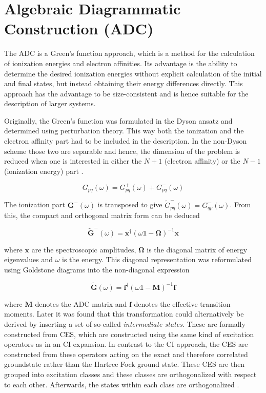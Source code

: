 \chapter{Algebraic Diagrammatic Construction (ADC)}

The \acl{ADC} is a Green's function approach, which is a method for the
calculation of ionization
energies and electron affinities.
Its advantage is the ability to determine the desired ionization energies
without explicit calculation of the initial and final states, but instead
obtaining their energy differences directly.
This approach has the advantage to be size-consistent and is hence
suitable for the description of larger systems. \cite{Mertins96_1}

Originally, the Green's function was formulated in the Dyson ansatz and
determined using perturbation theory. This way both the ionization and the
electron affinity part had to be included in the description. In the non-Dyson
scheme those two are separable and hence, the dimension of the problem is reduced
when one is interested in either the $N+1$ (electron affinity)
or the $N-1$ (ionization energy) part \cite{Schirmer98}.

\begin{equation}
 G_{pq}(\omega) = G^+_{pq}(\omega) + G^-_{pq}(\omega)
\end{equation}

The ionization part $\mathbf{G^-}(\omega)$ is transposed to give
$\tilde{G}^-_{pq}(\omega) = G^-_{qp}(\omega)$. From this, the compact 
and orthogonal matrix
form can be deduced

\begin{equation}\label{matrixspec}
\mathbf{\tilde{G}}^-(\omega) = \mathbf{x}^\dagger
                               (\omega\mathds{1}-\mathbf{\Omega})^{-1}\mathbf{x}
\end{equation}

where $\mathbf{x}$ are the spectroscopic amplitudes, $\mathbf{\Omega}$ is
the diagonal matrix of energy eigenvalues and $\omega$ is the energy.
This diagonal representation was reformulated using Goldstone diagrams
into the non-diagonal expression

\begin{equation}\label{isradc}
\mathbf{\tilde{G}}(\omega) = \mathbf{f}^\dagger(\omega\mathds{1}-\mathbf{M})^{-1}\mathbf{f}
\end{equation}

where $\mathbf{M}$ denotes the \ac{ADC} matrix and $\mathbf{f}$ denotes
the effective transition moments.
Later it was found that this transformation could alternatively be
derived by inserting a set of so-called \emph{intermediate states}.
These are formally constructed from \ac{CES}, which are constructed
using the same kind of excitation operators as in an \ac{CI} expansion.
In contrast to the \ac{CI} approach, the \ac{CES}
are constructed from these operators
acting on the exact and therefore correlated groundstate rather than the
Hartree Fock ground state. These \ac{CES} are then
grouped into excitation classes
and these classes are orthogonalized with respect to each other. Afterwards,  
the states within each class are orthogonalized \cite{Mertins96_1}.


